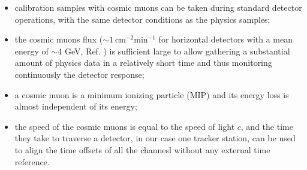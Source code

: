 \begin{itemize}
    \item calibration samples with cosmic muons 
    can be taken during standard detector operations, 
    with the same detector conditions as the physics samples;
    \item the cosmic muons flux 
    ($\sim 1 \ \text{cm}^{-2} \text{min}^{-1}$ 
    for horizontal detectors with a mean
    energy of $\sim$4 GeV, Ref. \cite{muonflux}) 
    is sufficient large to allow gathering a 
    substantial amount of 
    physics data in a relatively short time and 
    thus monitoring continuously the detector response;
    \item a cosmic muon is a minimum ionizing 
    particle (MIP) and 
    its energy loss is almost 
    independent of its energy;
    \item the speed of the cosmic muons is equal to the 
    speed of light $c$, and the time they take to traverse 
    a detector, in our case one tracker station, can be 
    used to align the time offsets of all the channesl 
    without any external time reference.
\end{itemize}
